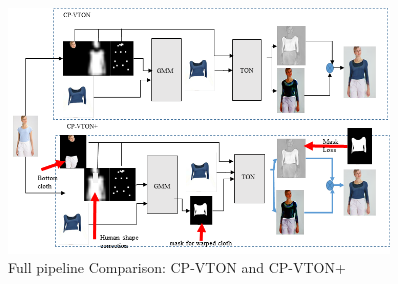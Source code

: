 \begin{figure}
\centering
\includegraphics[height=6.5cm, scale=1]{figures/cpvton+pipeline.png}   
\caption{Full pipeline Comparison: CP-VTON and CP-VTON+}
\label{fig:piepline}
\end{figure}


